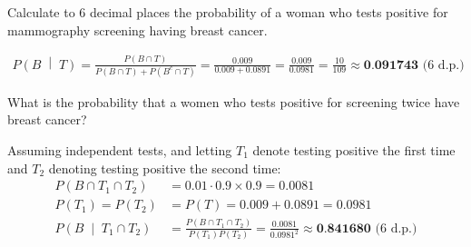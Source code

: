 \documentclass[12pt]{exam}
\begin{document}
\begin{questions}
\question Calculate to 6 decimal places the probability of a woman who tests positive for mammography screening having breast cancer.
\begin{tcolorbox}\vspace{-0.5cm}
\begin{align*}
    P\left(B\;\middle|\;T\right) = \frac{P(B \cap T)}{P(B\cap T) + P(B^c \cap T)} = \frac{0.009}{0.009 + 0.0891} = \frac{0.009}{0.0981} = \frac{10}{109} \approx \textbf{0.091743}\text{ (6 d.p.)}
\end{align*}
\end{tcolorbox}

\question What is the probability that a women who tests positive for screening twice have breast cancer?
\begin{tcolorbox}
Assuming independent tests, and letting $T_1$ denote testing positive the first time and $T_2$ denoting testing positive the second time:
\begin{align*}
    P(B \cap T_1 \cap T_2) &= 0.01 \cdot 0.9 \times 0.9 = 0.0081\\
    P(T_1) = P(T_2) &= P(T) = 0.009 + 0.0891 = 0.0981 \\
    P\left(B\;\middle|\;T_1\cap T_2\right) &= \frac{P(B \cap T_1 \cap T_2)}{P(T_1) P(T_2)} = \frac{0.0081}{0.0981^2} \approx \textbf{0.841680} \text{ (6 d.p.)}
\end{align*}
\end{tcolorbox}

\end{questions}
\vspace{-0.5cm}
\newpage
\end{document}
